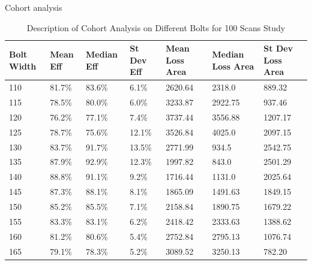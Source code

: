 Cohort analysis
\begin{table} [H] %
    \centering %
    \begin{tabular}{p{2cm}|p{2cm}|p{2cm}|p{2cm}|p{2cm}|p{2cm}|p{2cm}} %
        \textbf{Bolt Width} & \textbf{Mean Eff} & \textbf{Median Eff} & \textbf{St Dev Eff} & \textbf{Mean Loss Area} & \textbf{Median Loss Area} & \textbf{St Dev Loss Area}\\
        \hline %
        110& 81.7\% & 83.6\% & 6.1\% & 2620.64 & 2318.0 & 889.32\\
        115& 78.5\% & 80.0\% & 6.0\% & 3233.87 & 2922.75 & 937.46\\
        120& 76.2\% & 77.1\% & 7.4\% & 3737.44 & 3556.88 & 1207.17\\
        125& 78.7\% & 75.6\% & 12.1\% & 3526.84 & 4025.0 & 2097.15\\
        130& 83.7\% & 91.7\% & 13.5\% & 2771.99 & 934.5 & 2542.75\\
        135& 87.9\% & 92.9\% & 12.3\% & 1997.82 & 843.0 & 2501.29\\
        140& 88.8\% & 91.1\% & 9.2\% & 1716.44 & 1131.0 & 2025.64\\
        145& 87.3\% & 88.1\% & 8.1\% & 1865.09 & 1491.63 & 1849.15\\
        150& 85.2\% & 85.5\% & 7.1\% & 2158.84 & 1890.75 & 1679.22\\
        155& 83.3\% & 83.1\% & 6.2\% & 2418.42 & 2333.63 & 1388.62\\
        160& 81.2\% & 80.6\% & 5.4\% & 2752.84 & 2795.13 & 1076.74\\
        165& 79.1\% & 78.3\% & 5.2\% & 3089.52 & 3250.13 & 782.20\\
        \end{tabular}
    \caption{Description of Cohort Analysis on Different Bolts for 100 Scans Study}
\end{table}
